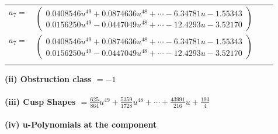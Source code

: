 \documentclass[1p]{elsarticle_modified}
\theoremstyle{definition}
\begin{document}
\begin{tabular}{m{7pt} m{180pt} m{7pt} m{180pt} }
\flushright $a_{7}=$&$\begin{pmatrix}0.0408546 u^{49}+0.0874636 u^{48}+\cdots-6.34781 u-1.55343\\0.0156250 u^{49}-0.0447049 u^{48}+\cdots-12.4293 u-3.52170\end{pmatrix}$\\ \flushright $a_{7}=$&$\begin{pmatrix}0.0408546 u^{49}+0.0874636 u^{48}+\cdots-6.34781 u-1.55343\\0.0156250 u^{49}-0.0447049 u^{48}+\cdots-12.4293 u-3.52170\end{pmatrix}$\\&\end{tabular}
\flushleft \textbf{(ii) Obstruction class $= -1$}\\~\\
\flushleft \textbf{(iii) Cusp Shapes $= \frac{625}{864} u^{49}+\frac{5359}{1728} u^{48}+\cdots+\frac{43991}{216} u+\frac{193}{4}$}\\~\\
\newpage\renewcommand{\arraystretch}{1}
\flushleft \textbf{(iv) u-Polynomials at the component}\newline \\
\end{document}

